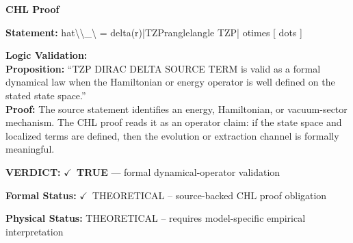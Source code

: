 \vspace{0.45em}
\noindent\textbf{CHL Proof}\par
\textbf{Statement:} hat\textbackslash{}\textbackslash{}\_\textbackslash{} = delta(r)|TZPranglelangle TZP| otimes [ dots ]

\textbf{Logic Validation:}\\
\textbf{Proposition:} ``TZP DIRAC DELTA SOURCE TERM is valid as a formal dynamical law when the Hamiltonian or
energy operator is well defined on the stated state space.''\\
\textbf{Proof:} The source statement identifies an energy, Hamiltonian, or vacuum-sector mechanism. The
CHL proof reads it as an operator claim: if the state space and localized terms are
defined, then the evolution or extraction channel is formally meaningful.

\textbf{VERDICT:} \ensuremath{\checkmark}\ \textbf{TRUE} --- formal dynamical-operator validation

\textbf{Formal Status:} \ensuremath{\checkmark}\ THEORETICAL -- source-backed CHL proof obligation

\textbf{Physical Status:} THEORETICAL -- requires model-specific empirical interpretation
\par\vspace{0.45em}
\par
\ifTZPDarkEdition
{}
\fi
\endgroup
\endgroup
